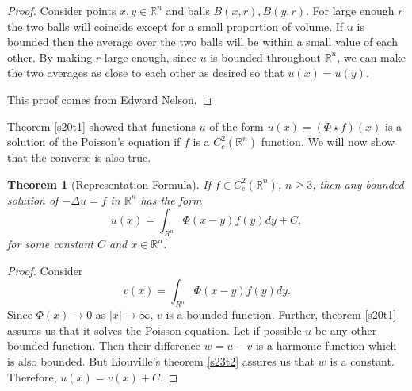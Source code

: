 \documentclass{article}
\theoremstyle{plain}
\newtheorem{thm}{Theorem}
\numberwithin{thm}{section}
\theoremstyle{plain}
\numberwithin{prop}{section}
\theoremstyle{definition}
\numberwithin{defn}{section}
\theoremstyle{remark}
\numberwithin{equation}{section}
\begin{document}
\begin{proof}
Consider points $x, y \in \mathbb{R}^n$ and balls $B(x, r), B(y, r)$. For large enough $r$ the two balls will
coincide except for a small proportion of volume. If $u$ is bounded then the average over the two balls will be
within a small value of each other. By making $r$ large enough, since $u$ is bounded throughout $\mathbb{R}^n$,
we can make the two averages as close to each other as desired so that $u(x) = u(y)$.

This proof comes from \href{https://en.wikipedia.org/wiki/Harmonic_function#Liouville%27s_theorem}{Edward Nelson}.
\end{proof}

Theorem \ref{s20t1} showed that functions $u$ of the form $u(x) = (\Phi \star f)(x)$ is a solution of the Poisson's
equation if $f$ is a $C_c^2(\mathbb{R}^n)$ function. We will now show that the converse is also true.
\begin{thm}[Representation Formula]\label{s23t3}
If $f \in C^2_c(\mathbb{R}^n)$, $n \ge 3$, then any bounded solution of $-\Delta u = f$ in $\mathbb{R}^n$ has the
form
\[
u(x) = \int_{R^n}\Phi(x - y)f(y)dy + C,
\]
for some constant $C$ and $x \in \mathbb{R}^n$.
\end{thm}
\begin{proof}
Consider
\[
v(x) = \int_{R^n}\Phi(x - y)f(y)dy.
\]
Since $\Phi(x) \rightarrow 0$ as $|x| \rightarrow \infty$, $v$ is a bounded function. Further, theorem \ref{s20t1}
assures us that it solves the Poisson equation. Let if possible $u$ be any other bounded function. Then their
difference $w = u - v$ is a harmonic function which is also bounded. But Liouville's theorem \eqref{s23t2} assures
us that $w$ is a constant. Therefore, $u(x) = v(x) + C$.
\end{proof}
\end{document}
